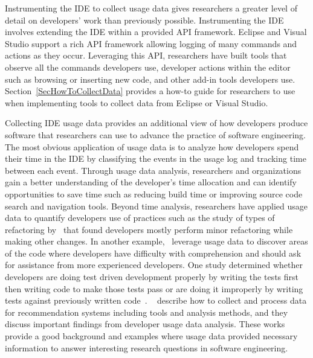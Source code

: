 \documentclass{book}
\begin{document}
Instrumenting the IDE to collect usage data gives researchers a greater level of detail on developers' work than previously possible. Instrumenting the IDE involves extending the IDE within a provided API framework.  Eclipse and Visual Studio support a rich API framework allowing logging of many commands and actions as they occur.  Leveraging this API, researchers have built tools that observe all the commands developers use, developer actions within the editor such as browsing or inserting new code, and other add-in tools developers use.  Section~\ref{SecHowToCollectData} provides a how-to guide for researchers to use when implementing tools to collect data from Eclipse or Visual Studio.  

Collecting IDE usage data provides an additional view of how developers produce software that researchers can use to advance the practice of software engineering.  
The most obvious application of usage data is to analyze how developers spend their time in the IDE by classifying the events in the usage log and tracking time between each event.  Through usage data analysis, researchers and organizations gain a better understanding of the developer's time allocation and can identify opportunities to save time such as reducing build time or improving source code search and navigation tools.  Beyond time analysis, researchers have applied usage data to quantify developers use of practices such as the study of types of refactoring by~ that found developers mostly perform minor refactoring while making other changes.  In another example,~ leverage usage data to discover areas of the code where developers have difficulty with comprehension and should ask for assistance from more experienced developers.  One study determined whether developers are doing test driven development properly by writing the tests first then writing code to make those tests pass or are doing it improperly by writing tests against previously written code~\cite{Kou2010Operational}.  ~ describe how to collect and process data for recommendation systems including tools and analysis methods, and they discuss important findings from developer usage data analysis.    These works provide a good background and examples where usage data provided necessary information to answer interesting research questions in software engineering.

\end{document}
